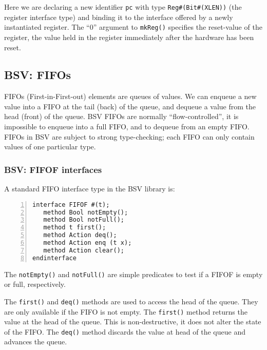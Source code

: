 Here we are declaring a new identifier \verb|pc| with type
\verb|Reg#(Bit#(XLEN))| (the register interface type) and binding it
to the interface offered by a newly instantiated register.  The ``0''
argument to \verb|mkReg()| specifies the reset-value of the register,
{\ie} the value held in the register immediately after the hardware
has been reset.


\subsection{BSV: FIFOs}


FIFOs (First-in-First-out) elements are queues of values.  We can
enqueue a new value into a FIFO at the tail (back) of the queue, and
dequeue a value from the head (front) of the queue.  BSV FIFOs are
normally ``flow-controlled'', {\ie} it is impossible to enqueue into a
full FIFO, and to dequeue from an empty FIFO.  FIFOs in BSV are
subject to strong type-checking; each FIFO can only contain values of
one particular type.


\subsubsection{BSV: FIFOF interfaces}


A standard FIFO interface type in the BSV library is:

\begin{Verbatim}[frame=single, numbers=left]
interface FIFOF #(t);
   method Bool notEmpty();
   method Bool notFull();
   method t first();
   method Action deq();
   method Action enq (t x);
   method Action clear();
endinterface
\end{Verbatim}

The \verb|notEmpty()| and \verb|notFull()| are simple predicates to
test if a FIFOF is empty or full, respectively.

The \verb|first()| and \verb|deq()| methods are used to access the
head of the queue.  They are only available if the FIFO is not empty.
The \verb|first()| method returns the value at the head of the queue.
This is non-destructive, {\ie} it does not alter the state of the
FIFO.  The \verb|deq()| method discards the value at head of the queue
and advances the queue.

